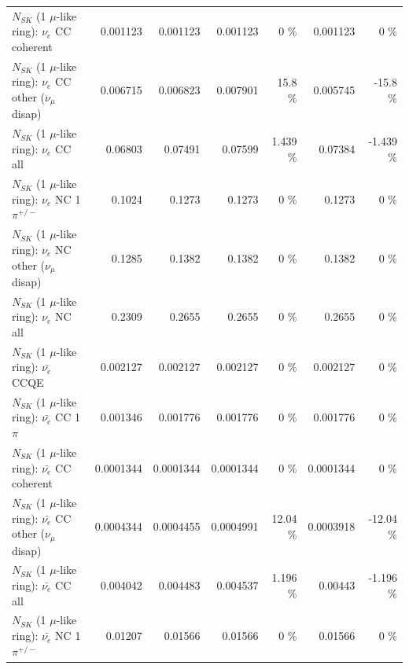 \begin{table}
\begin{tabular}{| l | r | r | r  r | r  r |}
                               $N_{SK}$ (1 $\mu$-like ring): $\nu_e$ CC coherent &        0.001123 &        0.001123 &        0.001123 &        0 \%  &        0.001123 &        0 \%  \\ 
                $N_{SK}$ (1 $\mu$-like ring): $\nu_e$ CC other ($\nu_\mu$ disap) &        0.006715 &        0.006823 &        0.007901 &     15.8 \%  &        0.005745 &    -15.8 \%  \\ 
                                  $N_{SK}$ (1 $\mu$-like ring): $\nu_{e}$ CC all &         0.06803 &         0.07491 &         0.07599 &    1.439 \%  &         0.07384 &   -1.439 \%  \\ 
\hline
                           $N_{SK}$ (1 $\mu$-like ring): $\nu_e$ NC 1$\pi^{+/-}$ &          0.1024 &          0.1273 &          0.1273 &        0 \%  &          0.1273 &        0 \%  \\ 
                $N_{SK}$ (1 $\mu$-like ring): $\nu_e$ NC other ($\nu_\mu$ disap) &          0.1285 &          0.1382 &          0.1382 &        0 \%  &          0.1382 &        0 \%  \\ 
                                  $N_{SK}$ (1 $\mu$-like ring): $\nu_{e}$ NC all &          0.2309 &          0.2655 &          0.2655 &        0 \%  &          0.2655 &        0 \%  \\ 
\hline
\hline
\hline
                                $N_{SK}$ (1 $\mu$-like ring): $\bar{\nu_e}$ CCQE &        0.002127 &        0.002127 &        0.002127 &        0 \%  &        0.002127 &        0 \%  \\ 
                           $N_{SK}$ (1 $\mu$-like ring): $\bar{\nu_e}$ CC 1$\pi$ &        0.001346 &        0.001776 &        0.001776 &        0 \%  &        0.001776 &        0 \%  \\ 
                         $N_{SK}$ (1 $\mu$-like ring): $\bar{\nu_e}$ CC coherent &       0.0001344 &       0.0001344 &       0.0001344 &        0 \%  &       0.0001344 &        0 \%  \\ 
          $N_{SK}$ (1 $\mu$-like ring): $\bar{\nu_e}$ CC other ($\nu_\mu$ disap) &       0.0004344 &       0.0004455 &       0.0004991 &    12.04 \%  &       0.0003918 &   -12.04 \%  \\ 
                            $N_{SK}$ (1 $\mu$-like ring): $\bar{\nu_{e}}$ CC all &        0.004042 &        0.004483 &        0.004537 &    1.196 \%  &         0.00443 &   -1.196 \%  \\ 
\hline
                     $N_{SK}$ (1 $\mu$-like ring): $\bar{\nu_e}$ NC 1$\pi^{+/-}$ &         0.01207 &         0.01566 &         0.01566 &        0 \%  &         0.01566 &        0 \%  \\ 

\end{tabular}
\end{table}
